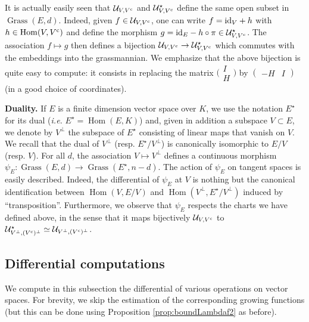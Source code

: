 \documentclass{sig-alternate}
\DeclareMathOperator{\Hom}{Hom}
\DeclareMathOperator{\Grass}{Grass}
\begin{document}
It is actually easily seen that $\mathcal U_{V, V^{\text{\rm c}}}$ and $\mathcal 
U^\star_{V, V^{\text{\rm c}}}$ define the same open subset in $\Grass(E,d)$. 
Indeed, given $f \in \mathcal U_{V, V^{\text{\rm c}}}$, one can write $f = \textrm{id}_V 
+ h$ with $h \in \Hom(V, V^\c)$ and define the morphism $g = \textrm{id}_E -
h \circ \pi \in \mathcal U^\star_{V, V^{\text{\rm c}}}$. The association $f \mapsto
g$ then defines a bijection $\mathcal U_{V, V^{\text{\rm c}}} \to \mathcal
U^\star_{V, V^{\text{\rm c}}}$ which commutes with the embeddings into the
grassmannian. We emphasize that the above bijection is quite easy to
compute: it consists in replacing the matrix 
$\Big(\begin{matrix} I \\ H \end{matrix}\Big)$ by $(\begin{matrix} -H & 
I \end{matrix})$ (in a good choice of coordinates).

\medskip

\noindent
{\bf Duality.}
If $E$ is a finite dimension vector space over $K$, we use the notation 
$E^\star$ for its dual (\emph{i.e.} $E^\star = \Hom(E,K)$) and, given in 
addition a subspace $V \subset E$, we denote by $V^\perp$ the subspace 
of $E^\star$ consisting of linear maps that vanish on $V$. We recall
that the dual of $V^\perp$ (resp. $E^\star/V^\perp$) is canonically
isomorphic to $E/V$ (resp. $V$).
For all $d$, the association $V \mapsto V^\perp$ defines a continuous 
morphism $\psi_E : \Grass(E,d) \to \Grass(E^\star, n-d)$. The action of 
$\psi_E$ on tangent spaces is easily described. Indeed, the differential 
of $\psi_E$ at $V$ is nothing but the canonical identification between
$\Hom(V, E/V)$ and $\Hom(V^\perp, E^\star/V^\perp)$ induced by 
``transposition''. Furthermore, we observe that $\psi_E$ respects
the charts we have defined above, in the sense that it maps bijectively 
$\mathcal U_{V, V^{\text{\rm c}}}$ to $\mathcal U^\star_{V^\perp, (V^{\text{\rm c}})^\perp}
\simeq \mathcal U_{V^\perp, (V^{\text{\rm c}})^\perp}$.

\subsection{Differential computations}

We compute in this subsection the differential of various operations on 
vector spaces. For brevity, we skip the estimation of the corresponding 
growing functions (but this can be done using Proposition 
\ref{prop:boundLambdaf2} as before).

\medskip
\end{document}
